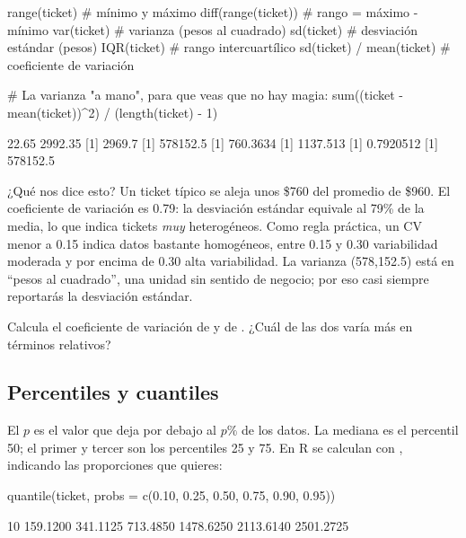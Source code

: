 \begin{rcode}
range(ticket)                  # mínimo y máximo
diff(range(ticket))            # rango = máximo - mínimo
var(ticket)                    # varianza (pesos al cuadrado)
sd(ticket)                     # desviación estándar (pesos)
IQR(ticket)                    # rango intercuartílico
sd(ticket) / mean(ticket)      # coeficiente de variación

# La varianza "a mano", para que veas que no hay magia:
sum((ticket - mean(ticket))^2) / (length(ticket) - 1)
\end{rcode}
\begin{rsalida}
[1]   22.65 2992.35
[1] 2969.7
[1] 578152.5
[1] 760.3634
[1] 1137.513
[1] 0.7920512
[1] 578152.5
\end{rsalida}

¿Qué nos dice esto? Un ticket típico se aleja unos \$760 del promedio de
\$960. El coeficiente de variación es 0.79: la desviación estándar equivale al
79\% de la media, lo que indica tickets \emph{muy} heterogéneos. Como regla
práctica, un CV menor a 0.15 indica datos bastante homogéneos, entre 0.15 y
0.30 variabilidad moderada y por encima de 0.30 alta variabilidad. La
varianza (578,152.5) está en ``pesos al cuadrado'', una unidad sin sentido de
negocio; por eso casi siempre reportarás la desviación estándar.

\begin{hazlotu}
Calcula el coeficiente de variación de  y de
. ¿Cuál de las dos varía más en términos relativos?
\end{hazlotu}

\subsection{Percentiles y cuantiles}

El  $p$ es el valor que deja por debajo al $p\%$ de los
datos. La mediana es el percentil 50; el primer y tercer
 son los percentiles 25 y 75. En R se calculan con
, indicando las proporciones que quieres:

\begin{rcode}
quantile(ticket, probs = c(0.10, 0.25, 0.50, 0.75, 0.90, 0.95))
\end{rcode}
\begin{rsalida}
      10%
 159.1200  341.1125  713.4850 1478.6250 2113.6140 2501.2725
\end{rsalida}

